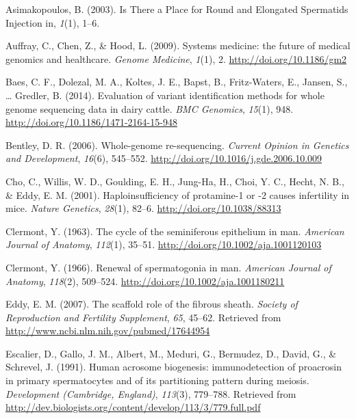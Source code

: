 \documentclass[12pt,twoside]{reedthesis}
\theoremstyle{definition}
\theoremstyle{definition}
\theoremstyle{remark}
\begin{document}
  \hypertarget{ref-Asimakopoulos2003}{}
  Asimakopoulos, B. (2003). Is There a Place for Round and Elongated
  Spermatids Injection in, \emph{1}(1), 1--6.
  
  \hypertarget{ref-Auffray2009}{}
  Auffray, C., Chen, Z., \& Hood, L. (2009). Systems medicine: the future
  of medical genomics and healthcare. \emph{Genome Medicine}, \emph{1}(1),
  2. \url{http://doi.org/10.1186/gm2}
  
  \hypertarget{ref-Baes2014}{}
  Baes, C. F., Dolezal, M. A., Koltes, J. E., Bapst, B., Fritz-Waters, E.,
  Jansen, S., \ldots{} Gredler, B. (2014). Evaluation of variant
  identification methods for whole genome sequencing data in dairy cattle.
  \emph{BMC Genomics}, \emph{15}(1), 948.
  \url{http://doi.org/10.1186/1471-2164-15-948}
  
  \hypertarget{ref-Bentley2006}{}
  Bentley, D. R. (2006). Whole-genome re-sequencing. \emph{Current Opinion
  in Genetics and Development}, \emph{16}(6), 545--552.
  \url{http://doi.org/10.1016/j.gde.2006.10.009}
  
  \hypertarget{ref-Cho2001}{}
  Cho, C., Willis, W. D., Goulding, E. H., Jung-Ha, H., Choi, Y. C.,
  Hecht, N. B., \& Eddy, E. M. (2001). Haploinsufficiency of protamine-1
  or -2 causes infertility in mice. \emph{Nature Genetics}, \emph{28}(1),
  82--6. \url{http://doi.org/10.1038/88313}
  
  \hypertarget{ref-Clermont1963}{}
  Clermont, Y. (1963). The cycle of the seminiferous epithelium in man.
  \emph{American Journal of Anatomy}, \emph{112}(1), 35--51.
  \url{http://doi.org/10.1002/aja.1001120103}
  
  \hypertarget{ref-Clermont1966}{}
  Clermont, Y. (1966). Renewal of spermatogonia in man. \emph{American
  Journal of Anatomy}, \emph{118}(2), 509--524.
  \url{http://doi.org/10.1002/aja.1001180211}
  
  \hypertarget{ref-Eddy2007}{}
  Eddy, E. M. (2007). The scaffold role of the fibrous sheath.
  \emph{Society of Reproduction and Fertility Supplement}, \emph{65},
  45--62. Retrieved from \url{http://www.ncbi.nlm.nih.gov/pubmed/17644954}
  
  \hypertarget{ref-Escalier1991}{}
  Escalier, D., Gallo, J. M., Albert, M., Meduri, G., Bermudez, D., David,
  G., \& Schrevel, J. (1991). Human acrosome biogenesis: immunodetection
  of proacrosin in primary spermatocytes and of its partitioning pattern
  during meiosis. \emph{Development (Cambridge, England)}, \emph{113}(3),
  779--788. Retrieved from
  \url{http://dev.biologists.org/content/develop/113/3/779.full.pdf}
  
\end{document}
